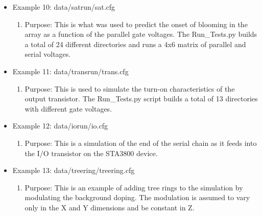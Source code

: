 \documentclass{article} %
\begin{document}
\begin{itemize}
  \item Example 10: data/satrun/sat.cfg
    \begin{enumerate}
      \item Purpose: This is what was used to predict the onset of blooming in the array as a function of the parallel gate voltages.  The Run\_Tests.py builds a total of 24 different directories and runs a 4x6 matrix of parallel and serial voltages.
    \end{enumerate}

  \item Example 11: data/transrun/trans.cfg
    \begin{enumerate}
      \item Purpose: This is used to simulate the turn-on characteristics of the output transistor.  The Run\_Tests.py script builds a total of 13 directories with different gate voltages.
    \end{enumerate}

      \item Example 12: data/iorun/io.cfg
    \begin{enumerate}
      \item Purpose: This is a simulation of the end of the serial chain as it feeds into the I/O transistor on the STA3800 device.
    \end{enumerate}

      \item Example 13: data/treering/treering.cfg
    \begin{enumerate}
      \item Purpose: This is an example of adding tree rings to the simulation by modulating the background doping.  The modulation is assumed to vary only in the X and Y dimensions and be constant in Z.
    \end{enumerate}
    
\end{itemize}
\end{document}

